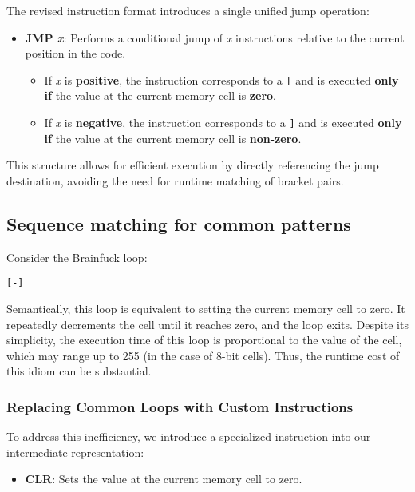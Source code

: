 The revised instruction format introduces a single unified jump operation:

\begin{itemize}
    \item \textbf{JMP \textit{x}}: Performs a conditional jump of \textit{x} instructions relative to the current position in the code.
    \begin{itemize}
        \item If \textit{x} is \textbf{positive}, the instruction corresponds to a \texttt{[} and is executed \textbf{only if} the value at the current memory cell is \textbf{zero}.
        \item If \textit{x} is \textbf{negative}, the instruction corresponds to a \texttt{]} and is executed \textbf{only if} the value at the current memory cell is \textbf{non-zero}.
    \end{itemize}
\end{itemize}

This structure allows for efficient execution by directly referencing the jump destination, avoiding the need for runtime matching of bracket pairs.

\subsection{Sequence matching for common patterns}
\label{subsec:ch2sec3sec3}

\par Consider the Brainfuck loop:

\begin{verbatim}
[-]
\end{verbatim}

Semantically, this loop is equivalent to setting the current memory cell to zero. It repeatedly decrements the cell until it reaches zero, and the loop exits. Despite its simplicity, the execution time of this loop is proportional to the value of the cell, which may range up to 255 (in the case of 8-bit cells). Thus, the runtime cost of this idiom can be substantial.

\subsubsection*{Replacing Common Loops with Custom Instructions}

To address this inefficiency, we introduce a specialized instruction into our intermediate representation:

\begin{itemize}
    \item \textbf{CLR}: Sets the value at the current memory cell to zero.
\end{itemize}

